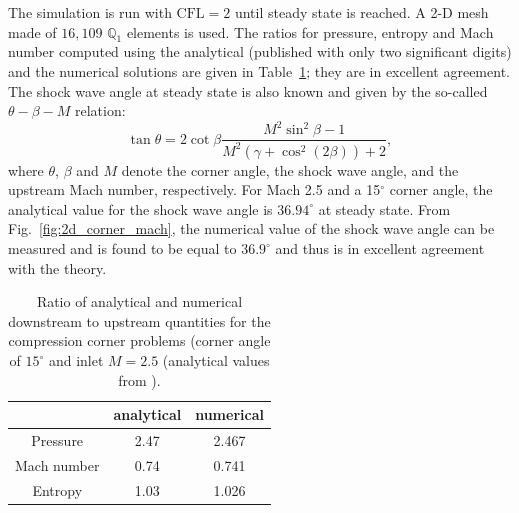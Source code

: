 \documentclass[review,10pt]{elsarticle}
\newcommand{\fig}[1]{Fig.~\ref{#1}}                      %
\newcommand{\tbl}[1]{Table~\ref{#1}}                     %
\begin{document}
The simulation is run with $\text{CFL}=2$ until steady state is reached. A 2-D mesh made of $16,109$ $\mathbb{Q}_1$ elements 
is used. The ratios for pressure, entropy and Mach number computed using the analytical (published with only two 
significant digits) and the numerical solutions are given in \tbl{tbl:corner_exact_sol}; they are in excellent 
agreement. The shock wave angle at steady state is also known and given by the so-called $\theta -\beta -M$ relation:
%
\begin{equation}
\tan \theta = 2 \cot \beta \frac{M^2 \sin^2 \beta -1}{M^2 \left(\gamma+\cos^2 (2\beta)\right)+2} ,
\end{equation}
%
where $\theta$, $\beta$ and $M$ denote the corner angle, the shock wave angle, and the upstream Mach number, respectively. 
For Mach 2.5 and a 15$^\circ$ corner angle, the analytical value for the shock wave angle is $36.94^\circ$ 
at steady state. From \fig{fig:2d_corner_mach}, the numerical value of the shock wave angle can be measured 
and is found to be equal to $36.9^{\circ}$ and thus is in excellent agreement with the theory.
%
\begin{table}[H]
\begin{center}
\begin{tabular}{|c|c|c|}  \hline
            & analytical & numerical\\ \hline
Pressure    & 2.47       & 2.467    \\ \hline
Mach number &  0.74      & 0.741    \\ \hline
Entropy     & 1.03       & 1.026    \\ \hline 
\end{tabular}
\caption{\label{tbl:corner_exact_sol} Ratio of analytical and numerical downstream to upstream quantities for 
the compression corner problems (corner angle of $15^\circ$ and inlet $M=2.5$ (analytical values from \cite{CompressionCorner}).}
\end{center}
\end{table}
%
\end{document}

